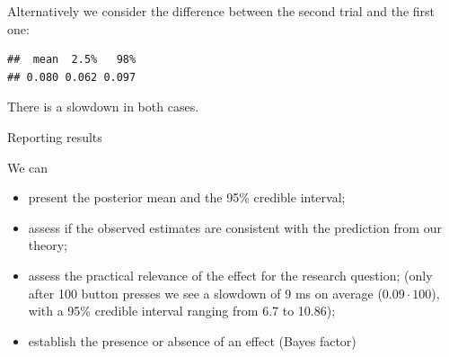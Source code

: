 \documentclass[12pt,ignorenonframetext,aspectratio=169]{beamer}
\newenvironment{Shaded}{\begin{snugshade}}{\end{snugshade}}
\newcommand{\CommentTok}[1]{\textcolor[rgb]{0.56,0.35,0.01}{\textit{#1}}}
\newcommand{\DataTypeTok}[1]{\textcolor[rgb]{0.13,0.29,0.53}{#1}}
\newcommand{\DecValTok}[1]{\textcolor[rgb]{0.00,0.00,0.81}{#1}}
\newcommand{\FloatTok}[1]{\textcolor[rgb]{0.00,0.00,0.81}{#1}}
\newcommand{\KeywordTok}[1]{\textcolor[rgb]{0.13,0.29,0.53}{\textbf{#1}}}
\newcommand{\NormalTok}[1]{#1}
\newcommand{\OperatorTok}[1]{\textcolor[rgb]{0.81,0.36,0.00}{\textbf{#1}}}
\newcommand{\StringTok}[1]{\textcolor[rgb]{0.31,0.60,0.02}{#1}}
\providecommand{\tightlist}{%
  \setlength{\itemsep}{0pt}\setlength{\parskip}{0pt}}
\begin{document}
\begin{frame}[fragile]

Alternatively we consider the difference between the second trial and the first one:

\scriptsize

\begin{Shaded}
\end{Shaded}

\begin{verbatim}
##  mean  2.5%   98% 
## 0.080 0.062 0.097
\end{verbatim}

\normalsize

There is a slowdown in both cases.

\end{frame}

\begin{frame}{Reporting results}
\protect\hypertarget{reporting-results}{}

\begin{block}{We can}

\begin{itemize}
\tightlist
\item
  present the posterior mean and the 95\% credible interval;
\item
  assess if the observed estimates are consistent with the prediction from our theory;
\item
  assess the practical relevance of the effect for the research question; (only after 100 button presses we see a slowdown of 9 ms on average (\(0.09 \cdot 100\)), with a 95\% credible interval ranging from 6.7 to 10.86);
\item
  establish the presence or absence of an effect (Bayes factor)
\end{itemize}

\end{block}

\end{frame}
\end{document}
